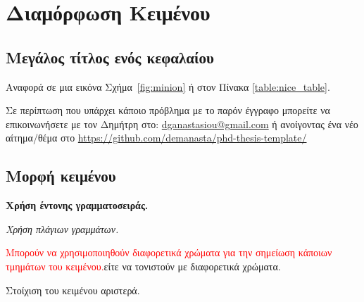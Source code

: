 
\chapter{Διαμόρφωση Κειμένου}

\ifpdf
    \graphicspath{{Chapter2/Figs/Raster/}{Chapter2/Figs/PDF/}{Chapter2/Figs/}}
\else
    \graphicspath{{Chapter2/Figs/Vector/}{Chapter2/Figs/}}
\fi


\section[Συμπτηγμένος τίτλος]{Μεγάλος τίτλος ενός κεφαλαίου}

Αναφορά σε μια εικόνα Σχήμα~\ref{fig:minion} ή στον Πίνακα \ref{table:nice_table}.


Σε περίπτωση που υπάρχει κάποιο πρόβλημα με το παρόν έγγραφο μπορείτε να επικοινωνήσετε με τον Δημήτρη στο: \href{mailto:dganastasiou@gmail.com}{dganastasiou@gmail.com} ή ανοίγοντας ένα νέο αίτημα/θέμα στο \url{https://github.com/demanasta/phd-thesis-template/}


\section{Μορφή κειμένου}
\textbf{Χρήση έντονης γραμματοσειράς.}

\textit{Χρήση πλάγιων γραμμάτων.}

\textcolor{red}{Μπορούν να χρησιμοποιηθούν διαφορετικά χρώματα για την σημείωση κάποιων τμημάτων του κειμένου.}\colorbox{BurntOrange}{είτε να τονιστούν με διαφορετικά χρώματα.}

\begin{flushleft}
Στοίχιση του κειμένου αριστερά.
\end{flushleft}


